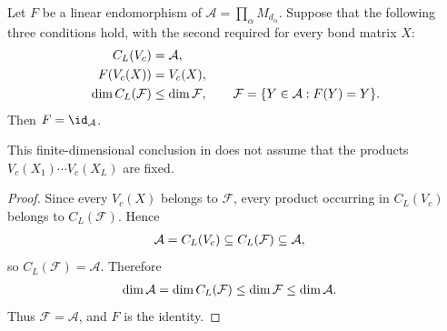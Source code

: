 \begin{lemma}
    \label{thm:mpdo_fixed_contractions_product_dimension}
    \leanok
    Let $F$ be a linear endomorphism of
    $\mathcal A=\prod_\alpha M_{d_\alpha}$. Suppose that the following three
    conditions hold, with the second required for every bond matrix $X$:
    \begin{align}
        C_L(V_c)             & =\mathcal A,
        \notag                                     \\
        F(V_c(X))            & =V_c(X),
        \notag                                     \\
        \dim C_L(\mathcal F) & \leq\dim\mathcal F,
        \qquad
        \mathcal F=\{Y\in\mathcal A:F(Y)=Y\}.
        \notag
    \end{align}
    Then $F=\id_{\mathcal A}$.

    This finite-dimensional conclusion in
    \cite[Appendix~C.4, lines~1980--1993]{Cirac2016MPDO_arXiv} does not
    assume that the products $V_c(X_1)\cdots V_c(X_L)$ are fixed.
\end{lemma}

\begin{proof}\leanok
    Since every $V_c(X)$ belongs to $\mathcal F$, every product occurring in
    $C_L(V_c)$ belongs to $C_L(\mathcal F)$. Hence
    \begin{align}
        \mathcal A=C_L(V_c)
         & \subseteq C_L(\mathcal F)\subseteq\mathcal A,
        \notag
    \end{align}
    so $C_L(\mathcal F)=\mathcal A$. Therefore
    \begin{align}
        \dim\mathcal A=\dim C_L(\mathcal F)
         & \leq\dim\mathcal F\leq\dim\mathcal A.
        \notag
    \end{align}
    Thus $\mathcal F=\mathcal A$, and $F$ is the identity.
\end{proof}


